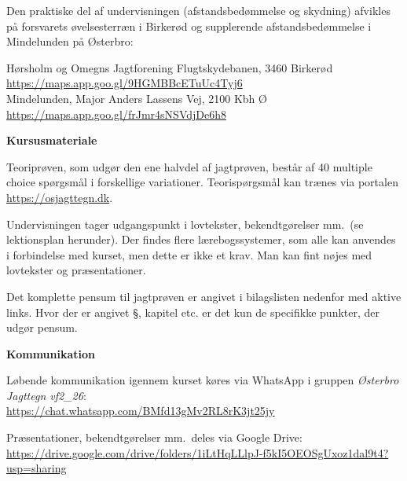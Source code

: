 \documentclass[10pt,a4paper]{article}
\begin{document}
\begin{flushleft}
\vspace{0.2cm}
Den praktiske del af undervisningen (afstandsbedømmelse og skydning) afvikles på forsvarets øvelsesterræn i Birkerød og supplerende afstandsbedømmelse i Mindelunden på Østerbro:

\vspace{0.1cm}
\hspace{1em} Hørsholm og Omegns Jagtforening Flugtskydebanen, 3460 Birkerød\\
\hspace{1em} \url{https://maps.app.goo.gl/9HGMBBcETuUc4Tyj6}
\\
\vspace{0.2cm}
\hspace{1em} Mindelunden, Major Anders Lassens Vej, 2100 Kbh Ø\\
\hspace{1em} \url{https://maps.app.goo.gl/frJmr4sNSVdjDe6h8}

\vspace{0.4cm}
\textbf{Kursusmateriale}

\vspace{0.1cm}
Teoriprøven, som udgør den ene halvdel af jagtprøven, består af 40 multiple choice spørgsmål i forskellige variationer. Teorispørgsmål kan trænes via portalen \url{https://osjagttegn.dk}.

\vspace{0.2cm}
Undervisningen tager udgangspunkt i lovtekster, bekendtgørelser mm.\ (se lektionsplan herunder). Der findes flere lærebogssystemer, som alle kan anvendes i forbindelse med kurset, men dette er ikke et krav. Man kan fint nøjes med lovtekster og præsentationer.

\vspace{0.2cm}
Det komplette pensum til jagtprøven er angivet i bilagslisten nedenfor med aktive links. Hvor der er angivet §, kapitel etc. er det kun de specifikke punkter, der udgør pensum. 

\vspace{0.4cm}
\textbf{Kommunikation}

\vspace{0.1cm}
Løbende kommunikation igennem kurset køres via WhatsApp i gruppen \emph{Østerbro Jagttegn vf2\_26}:\\
\url{https://chat.whatsapp.com/BMfd13gMv2RL8rK3jt25jy}

\vspace{0.2cm}
Præsentationer, bekendtgørelser mm.\ deles via Google Drive:\\
\url{https://drive.google.com/drive/folders/1iLtHqLLlpJ-f5kI5OEOSgUxoz1dal9t4?usp=sharing}


\end{flushleft}
\end{document}
